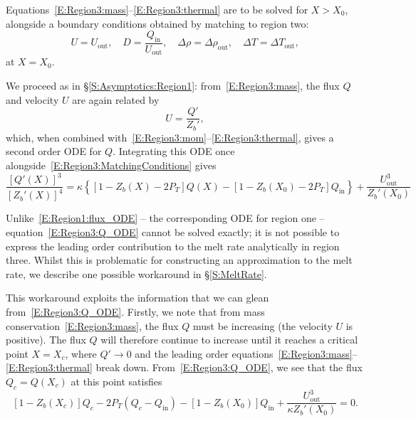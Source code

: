 \documentclass[openacc]{rsproca_new}%
\newcommand{\Pt}{\textit{P}_T}
\renewcommand{\in}{\text{in}} %
\newcommand{\out}{\text{out}}
\begin{document}
Equations~\eqref{E:Region3:mass}--\eqref{E:Region3:thermal} are to be solved for $X > X_0$, alongside a boundary conditions obtained by matching to region two:
\begin{equation}\label{E:Region3:MatchingConditions}
U = U_\out, \quad D = \frac{Q_\in}{U_\out}, \quad \Delta \rho = \Delta \rho_\out, \quad \Delta T = \Delta T_\out,
\end{equation}
at $X = X_0$. 

We proceed as in \S\ref{S:Asymptotics:Region1}: from~\eqref{E:Region3:mass}, the flux $Q$ and velocity $U$ are again related by
\begin{equation}\label{E:Region3:U_Q_relation}
U = \frac{Q'}{Z_b'},
\end{equation}
which, when combined with~\eqref{E:Region3:mom}--\eqref{E:Region3:thermal}, gives a second order ODE for $Q$. Integrating this ODE once alongside~\eqref{E:Region3:MatchingConditions} gives
\begin{equation}\label{E:Region3:Q_ODE}
\frac{\left[Q'(X)\right]^3}{\left[Z_b'(X)\right]^4} = \kappa \left\{ \left[1 - Z_b(X) - 2P_T\right] Q(X) - \left[1 - Z_b(X_0) - 2P_T\right]Q_\text{in}\right\} + \frac{U_\text{out}^3}{Z_b'(X_0)}
\end{equation}

Unlike~\eqref{E:Region1:flux_ODE} -- the corresponding ODE for region one -- equation~\eqref{E:Region3:Q_ODE} cannot be solved exactly; it is not possible to express the leading order contribution to the melt rate analytically in region three. Whilst this is problematic for constructing an approximation to the melt rate, we describe one possible workaround in \S\ref{S:MeltRate}. 

This workaround exploits the information that we can glean from~\eqref{E:Region3:Q_ODE}. Firstly, we note that from mass conservation~\eqref{E:Region3:mass}, the flux $Q$ must be increasing (the velocity $U$ is positive). The flux $Q$ will therefore continue to increase until it reaches a critical point $X = X_c$, where $Q' \to 0$ and the leading order equations~\eqref{E:Region3:mass}--\eqref{E:Region3:thermal} break down. From~\eqref{E:Region3:Q_ODE}, we see that the flux $Q_c =Q(X_c)$ at this point satisfies 
\begin{equation}
\left[1 - Z_b(X_c)\right]Q_c - 2\Pt\left(Q_c - Q_\in\right) -\left[1 - Z_b(X_0)\right]Q_\in +  \frac{U_\out^3}{\kappa Z_b'(X_0)} = 0.
\end{equation}
\end{document}
